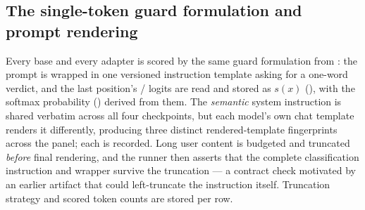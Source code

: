 \begin{table}[htbp]
\centering\small
\caption{The fixed model panel and the frozen clean-v2 LoRA-SFT recipe (shared by Acts~I--II).
Revisions are pinned; decision tokens are verified as distinct single tokens per checkpoint.}
\label{tab:panel-recipe}
\end{table}

\subsection{The single-token guard formulation and prompt rendering}
\label{sec:setup-guard}

Every base and every adapter is scored by the same guard formulation from : the
prompt is wrapped in one versioned instruction template asking for a one-word verdict, and the last
position's / logits are read and stored as $s(x)$ (), with the
softmax probability () derived from them. The \emph{semantic} system instruction is
shared verbatim across all four checkpoints, but each model's own chat template renders it differently,
producing three distinct rendered-template fingerprints across the panel; each is recorded. Long user
content is budgeted and truncated \emph{before} final rendering, and the runner then asserts that the
complete classification instruction and wrapper survive the truncation --- a contract check motivated by
an earlier artifact that could left-truncate the instruction itself. Truncation strategy and scored
token counts are stored per row.

